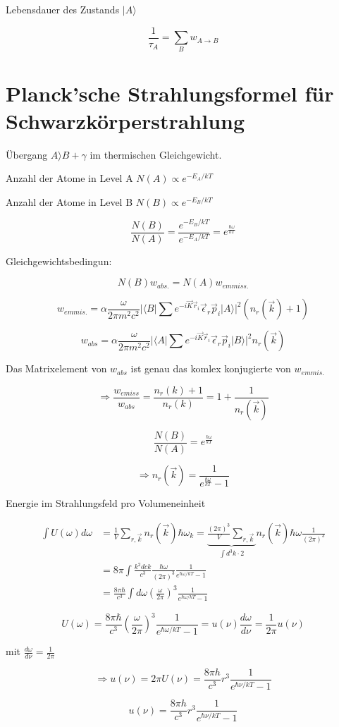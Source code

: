 Lebensdauer des Zustands \(|A\rangle \)

\[\boxed{\frac{1}{\tau_A} = \sum_B w_{A\to B}}\]


\section{Planck'sche Strahlungsformel für Schwarzkörperstrahlung}


Übergang \(A\rangle B+\gamma\) im thermischen Gleichgewicht. 

Anzahl der Atome in Level A \(N(A)\propto e^{-E_A/kT}\)

Anzahl der Atome in Level B \(N(B)\propto e^{-E_B/kT}\)

\[\frac{N(B)}{N(A)} = \frac{e^{-E_B/kT}}{e^{-E_A/kT}} = e^{\frac{\hbar \omega}{kT}}\]

Gleichgewichtsbedingun:

\[N(B) w_{abs.} = N(A)w_{emmiss.}\]


\[w_{emmis.} = \alpha \frac{\omega}{2\pi m^2c^2}|\langle B|\sum e^{-i\vec K\vec r_i}\vec \epsilon_r\vec p_i|A\rangle |^2(n_r(\vec k)+1)\]

\[w_{abs} = \alpha \frac{\omega}{2\pi m^2c^2}|\langle A|\sum e^{-i\vec K\vec r_i}\vec \epsilon_r\vec p_i|B\rangle |^2n_r(\vec k)\]

Das Matrixelement von \(w_{abs}\) ist genau das komlex konjugierte von \(w_{emmis.}\)

\[\Rightarrow \frac{w_{emiss}}{w_{abs}} = \frac{n_r(k)+1}{n_r(k)} = 1+\frac{1}{n_r(\vec k)}\]

\[\frac{N(B)}{N(A)} = e^{\frac{\hbar\omega}{kT}}\]


\[\Rightarrow \boxed{n_r(\vec k) = \frac{1}{e^{\frac{\hbar\omega}{kT}}-1} } \]


Energie im Strahlungsfeld pro Volumeneinheit

\begin{align}
\int U(\omega)d\omega &= \frac{1}{V} \sum_{r,\vec k}n_r(\vec k) \hbar \omega_k = \underbrace{\frac{(2\pi)^3}{V}\sum_{r,\vec k}}_{\int d^3 k\cdot 2}  n_r(\vec k)\hbar\omega \frac{1}{(2\pi)^3}\\
&=8\pi \int \frac{k^2 dck}{c^3}\frac{\hbar\omega}{(2\pi)^3}\frac{1}{e^{\hbar\omega/kT}-1}\\
&= \frac{8\pi\hbar}{c^3}\int d\omega (\frac{\omega}{2\pi})^3 \frac{1}{e^{\hbar\omega/kT}-1}
\end{align}


\[U(\omega) = \frac{8\pi\hbar}{c^3} (\frac{\omega}{2\pi})^3 \frac{1}{e^{\hbar\omega/kT}-1} = u(\nu) \frac{d\omega}{d\nu} = \frac{1}{2\pi}u(\nu) \]

mit \(\frac{d\omega}{d\nu} = \frac{1}{2\pi}\)

\[\Rightarrow u(\nu) = 2\pi U(\nu) = \frac{8\pi h}{c^3} r^3 \frac{1}{e^{\hbar\nu/kT}-1} \]

\[\boxed{ u(\nu)= \frac{8\pi h}{c^3} r^3 \frac{1}{e^{\hbar\nu/kT}-1}  }  \]





